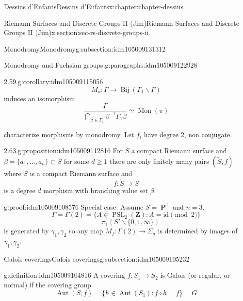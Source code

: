 \documentclass[oneside,10pt,]{book}
\numberwithin{equation}{section}
\newcommand{\inv}{^{-1}}
\newcommand{\ZZ}{\mathbf{Z}}
\newcommand{\id}{\mathrm{id}}
\DeclareMathOperator{\PP}{\mathbf{P}}
\DeclareMathOperator{\Aut}{Aut}
\DeclareMathOperator{\PSL}{PSL}
\begin{document}
\begin{chapterptx}{Dessins d'Enfants}{}{Dessins d'Enfants}{}{}{x:chapter:chapter-dessins}
\begin{sectionptx}{Riemann Surfaces and Discrete Groups II (Jim)}{}{Riemann Surfaces and Discrete Groups II (Jim)}{}{}{x:section:sec-rs-discrete-groups-ii}
\begin{subsectionptx}{Monodromy}{}{Monodromy}{}{}{g:subsection:idm105009131312}
\begin{paragraphs}{Monodromy and Fuchsian groups.}{g:paragraphs:idm105009122928}
\begin{corollary}{2.59.}{}{g:corollary:idm105009115056}%
%
\begin{equation*}
M_\pi \colon \Gamma \to \operatorname{Bij} (\Gamma_1 \backslash \Gamma)
\end{equation*}
induces an isomorphism%
\begin{equation*}
\frac{\Gamma}{\bigcap_{\beta\in \Gamma_1} \beta\inv \Gamma_1 \beta} \simeq \operatorname{Mon}(\pi)
\end{equation*}
%
\end{corollary}
characterize morphisms by monodromy. Let \(f_i\) have degree 2, non conjugate.%
\begin{proposition}{2.63.}{}{g:proposition:idm105009112816}%
For \(S\) a compact Riemann surface and \(\beta = \{ a_1, \ldots, a_n\} \subset S\) for some \(d \ge 1\) there are only finitely many pairs \((\tilde S, f)\) where \(\tilde S\) is a compact Riemann surface and%
\begin{equation*}
f\colon \tilde S \to S
\end{equation*}
is a degree \(d\) morphism with branching  value set \(\beta\).%
\end{proposition}
\begin{proofptx}{}{g:proof:idm105009108576}
Special case: Assume \(S = \PP^1\) and \(n=3\).%
\begin{equation*}
\Gamma = \Gamma(2) = \{ A \in \PSL_2(\ZZ) : A = \id \pmod 2\}
\end{equation*}
%
\begin{equation*}
= \pi_1 (S' \smallsetminus \{0,1,\infty\})
\end{equation*}
is generated by \(\gamma_1, \gamma_2\) so any map \(M_f \colon \Gamma(2) \to \Sigma_d\) is determined by  images of \(\gamma_1, \gamma_2\).%
\end{proofptx}
\end{paragraphs}%
\end{subsectionptx}
%
%
\typeout{************************************************}
\typeout{************************************************}
%
\begin{subsectionptx}{Galois coverings}{}{Galois coverings}{}{}{g:subsection:idm105009105232}
\begin{definition}{}{g:definition:idm105009104816}%
A covering \(f\colon S_1\to S_2\) is Galois (or regular, or normal) if the covering group%
\begin{equation*}
\Aut(S,f) =  \{ h\in \Aut(S_1) : f\circ h= f\} = G

\end{equation*}
\end{definition}
\end{subsectionptx}
\end{sectionptx}
\end{chapterptx}
\end{document}
